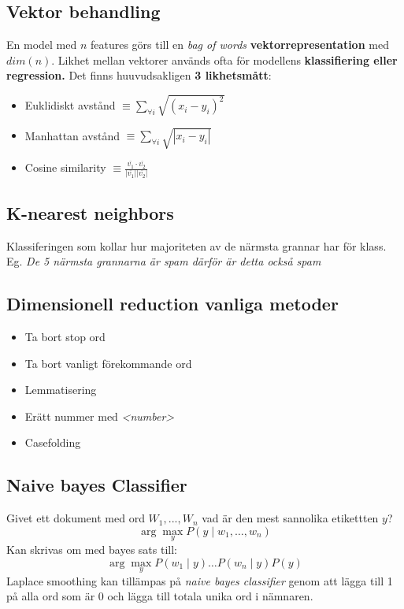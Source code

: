 \documentclass[12pt,a4paper]{article}
\begin{document}
\subsection*{Vektor behandling}
En model med $n$ features görs till en \textit{bag of words }\textbf{vektorrepresentation} med $dim(n)$. Likhet mellan vektorer används ofta för modellens \textbf{klassifiering eller regression.} Det finns huuvudsakligen \textbf{3 likhetsmått}:  
\begin{itemize}
    \item Euklidiskt avstånd $\equiv \sum\limits_{\forall i}\sqrt{(x_i - y_i)^2}$
    \item Manhattan avstånd $\equiv \sum\limits_{\forall i} \sqrt{|x_i - y_i|}$
    \item Cosine similarity { $\displaystyle \equiv \frac{\overline{v_1} \cdot \overline{v_2}}{|\overline{v_1}||\overline{v_2}|}$}

\end{itemize}
\noindent\hrulefill

\subsection*{K-nearest neighbors}
Klassiferingen som kollar hur majoriteten av de närmsta grannar har för klass. Eg. \textit{De 5 närmsta grannarna är spam därför är detta också spam}

\noindent\hrulefill
\subsection*{Dimensionell reduction vanliga metoder}
\begin{itemize}
    \item Ta bort stop ord
    \item Ta bort vanligt förekommande ord
    \item Lemmatisering 
    \item Erätt nummer med \textit{<number>}
    \item Casefolding
    
\end{itemize}

\noindent\hrulefill

\subsection*{Naive bayes Classifier}
Givet ett dokument med ord $W_1,...,W_n$ vad är den mest sannolika etikettten $y$?
$$\arg \max_{y} P(y \mid w_1, \dots, w_n)$$
Kan skrivas om med bayes sats till:
$$\arg \max_{y} P(w_1 \mid y) \dots P(w_n \mid y) P(y)$$
Laplace smoothing kan tillämpas på \textit{naive bayes classifier} genom att lägga till 1 på alla ord som är 0 och lägga till totala unika ord i nämnaren.
\end{document}
